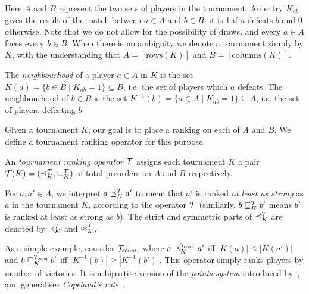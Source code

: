 Here $A$ and $B$ represent the two sets of players in the
tournament.\footnotemark{} An entry $K_{ab}$ gives the result of the match
between $a \in A$ and $b \in B$: it is 1 if $a$ defeats $b$ and 0 otherwise.
Note that we do not allow for the possibility of draws, and every $a \in A$
faces every $b \in B$.
%
When there is no ambiguity we denote a tournament simply by $K$, with the
understanding that $A = [\text{rows}(K)]$ and $B = [\text{columns}(K)]$.

The \emph{neighbourhood} of a player $a \in A$ in $K$ is the set $K(a) = \{b
\in B \mid K_{ab} = 1\} \subseteq B$, i.e. the set of players which $a$
defeats. The neighbourhood of $b \in B$ is the set $K^{-1}(b) = \{a \in A \mid
K_{ab} = 1\} \subseteq A$, i.e. the set of players defeating $b$.


Given a tournament $K$, our goal is to place a ranking on each of $A$ and $B$.
We define a tournament ranking operator for this purpose.

\begin{definition}%

    An \emph{tournament ranking operator} $\mathcal{T}$ assigns each tournament $K$ a
    pair $\mathcal{T}(K) = ({\preceq_K^{\mathcal{T}}}, {\sqsubseteq_K^{\mathcal{T}}})$ of total preorders on $A$ and $B$
    respectively.

\end{definition}

For $a, a' \in A$, we interpret $a \preceq_K^{\mathcal{T}} a'$ to mean that $a'$ is ranked
\emph{at least as strong} as $a$ in the tournament $K$, according to the
operator $\mathcal{T}$ (similarly, $b \sqsubseteq_K^{\mathcal{T}} b'$ means $b'$ is ranked at least as
strong as $b$). The strict and symmetric parts of ${\preceq_K^{\mathcal{T}}}$ are denoted
by ${\prec_K^{\mathcal{T}}}$ and ${\approx_K^{\mathcal{T}}}$.

As a simple example, consider ${\mathcal{T}_{\mathsf{count}}}$, where $a \preceq_K^{\mathcal{T}_{\mathsf{count}}} a'$ iff
$|K(a)| \le |K(a')|$ and $b \sqsubseteq_K^{\mathcal{T}_{\mathsf{count}}} b'$ iff $|K^{-1}(b)| \ge
|K^{-1}(b')|$. This operator simply ranks players by number of victories. It is
a bipartite version of the \emph{points system} introduced
by~\textcite{rubinstein1980ranking}, and generalises \emph{Copeland's
rule}~\cite{brandt2016a}.

